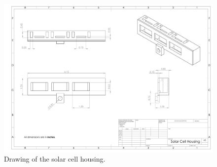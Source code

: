 \begin{centering}
    \begin{figure}[H]
    \includegraphics[width=\textwidth]{Figures/solar-cell-housing.pdf}
    \caption{Drawing of the solar cell housing.}
    \label{fig:solar-cell-housing}
  \end{figure}  



\end{centering}
